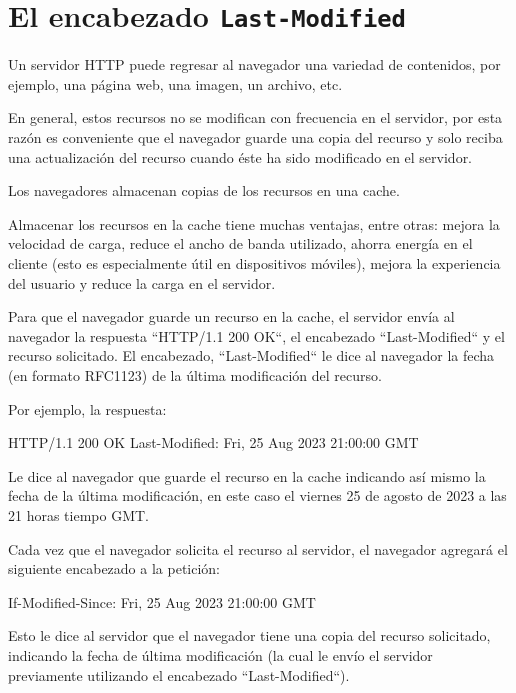 \documentclass[11pt,a4paper,oneside]{book}
\begin{document}
\section{El encabezado \texttt{Last-Modified}}

Un servidor HTTP puede regresar al navegador una variedad de contenidos, por ejemplo, una página web, una imagen, un archivo, etc.

En general, estos recursos no se modifican con frecuencia en el servidor, por esta razón es conveniente que el navegador guarde una copia del recurso y solo reciba una actualización del recurso cuando éste ha sido modificado en el servidor.

Los navegadores almacenan copias de los recursos en una cache.

Almacenar los recursos en la cache tiene muchas ventajas, entre otras: mejora la velocidad de carga, reduce el ancho de banda utilizado, ahorra energía en el cliente (esto es especialmente útil en dispositivos móviles), mejora la experiencia del usuario y reduce la carga en el servidor.

Para que el navegador guarde un recurso en la cache, el servidor envía al navegador la respuesta ``HTTP/1.1 200 OK``, el encabezado ``Last-Modified`` y el recurso solicitado. El encabezado, ``Last-Modified`` le dice al navegador la fecha (en formato RFC1123) de la última modificación del recurso.

Por ejemplo, la respuesta:

\begin{SourceCode}
HTTP/1.1 200 OK
Last-Modified:  Fri, 25 Aug 2023 21:00:00 GMT
\end{SourceCode}

Le dice al navegador que guarde el recurso en la cache indicando así mismo la fecha de la última modificación, en este caso el viernes 25 de agosto de 2023 a las 21 horas tiempo GMT.

Cada vez que el navegador solicita el recurso al servidor, el navegador agregará el siguiente encabezado a la petición:

\begin{SourceCode}
If-Modified-Since: Fri, 25 Aug 2023 21:00:00 GMT
\end{SourceCode}

Esto le dice al servidor que el navegador tiene una copia del recurso solicitado, indicando la fecha de última modificación (la cual le envío el servidor previamente utilizando el encabezado ``Last-Modified``).
\end{document}

